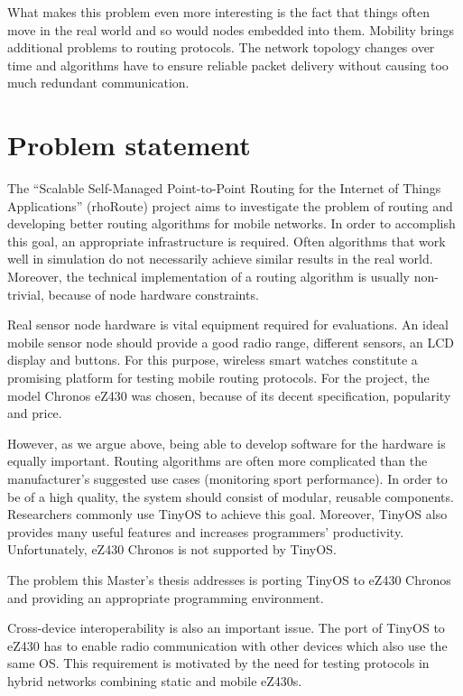 What makes this problem even more interesting is the fact that things often move in the real world and so would nodes embedded into them.
Mobility brings additional problems to routing protocols.
The network topology changes over time and algorithms have to ensure reliable packet delivery without causing too much redundant communication.


\section{Problem statement}
The ``Scalable Self-Managed Point-to-Point Routing for the Internet of Things Applications'' (rhoRoute) project aims to investigate the problem of routing and developing better routing algorithms for mobile networks.
In order to accomplish this goal, an appropriate infrastructure is required.
Often algorithms that work well in simulation do not necessarily achieve similar results in the real world.
Moreover, the technical implementation of a routing algorithm is usually non-trivial, because of node hardware constraints.

Real sensor node hardware is vital equipment required for evaluations.
An ideal mobile sensor node should provide a good radio range, different sensors, an LCD display and buttons.
For this purpose, wireless smart watches constitute a promising platform for testing mobile routing protocols.
For the project, the model Chronos eZ430 \cite{eZ430Chronos} was chosen, because of its decent specification, popularity and price.

However, as we argue above, being able to develop software for the hardware is equally important.
Routing algorithms are often more complicated than the manufacturer's suggested use cases (monitoring sport performance). 
In order to be of a high quality, the system should consist of modular, reusable components.
Researchers commonly use TinyOS \cite{TinyOS} to achieve this goal.
Moreover, TinyOS also provides many useful features and increases programmers' productivity.  Unfortunately, eZ430 Chronos is not supported by TinyOS.

The problem this Master's thesis addresses is porting TinyOS to eZ430 Chronos and providing an appropriate programming environment. 

Cross-device interoperability is also an important issue.
The port of TinyOS to eZ430 has to enable radio communication with other devices which also use the same OS.
This requirement is motivated by the need for testing protocols in hybrid networks combining static and mobile eZ430s.

